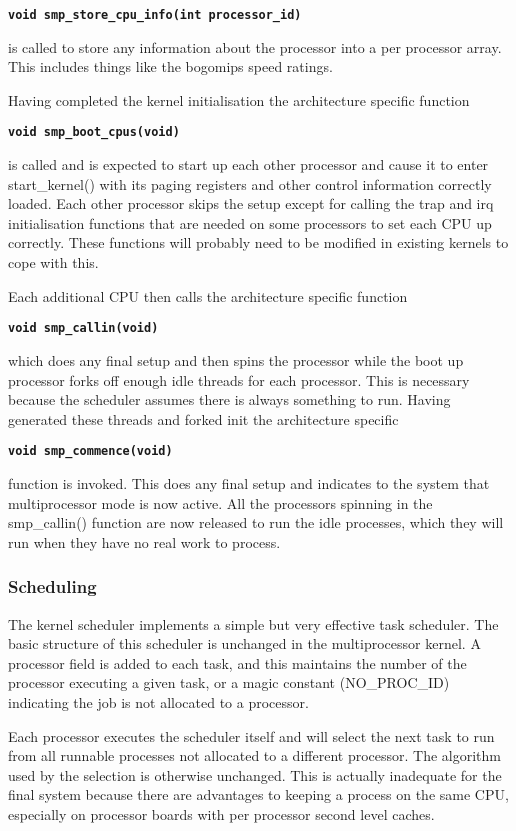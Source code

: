 \documentclass[]{article}
\begin{document}
{\tt \bf{void smp\_store\_cpu\_info(int processor\_id) }}

is called to store any information about the processor into a per processor 
array. This includes things like the bogomips speed ratings.

Having completed the kernel initialisation the architecture specific 
function

{\tt \bf void smp\_boot\_cpus(void) }

is called and is expected to start up each other processor and cause it to 
enter start\_kernel() with its paging registers and other control 
information correctly loaded. Each other processor skips the setup except 
for calling the trap and irq initialisation functions that are needed on 
some processors to set each CPU up correctly.  These functions will 
probably need to be modified in existing kernels to cope with this.


Each additional CPU then calls the architecture specific function

{\tt \bf void smp\_callin(void)}

which does any final setup and then spins the processor while the boot 
up processor forks off enough idle threads for each processor. This is 
necessary because the scheduler assumes there is always something to run. 
Having generated these threads and forked init the architecture specific 

{\tt \bf void smp\_commence(void)}

function is invoked. This does any final setup and indicates to the system 
that multiprocessor mode is now active. All the processors spinning in the 
smp\_callin() function are now released to run the idle processes, which 
they will run when they have no real work to process.


\subsubsection{Scheduling}
The kernel scheduler implements a simple but very effective task 
scheduler. The basic structure of this scheduler is unchanged in the 
multiprocessor kernel. A processor field is added to each task, and this 
maintains the number of the processor executing a given task, or a magic 
constant (NO\_PROC\_ID)  indicating the job is not allocated to a processor. 
	 
Each processor executes the scheduler itself and will select the next task 
to run from all runnable processes not allocated to a different processor. 
The algorithm used by the selection is otherwise unchanged. This is 
actually inadequate for the final system because there are advantages to 
keeping a process on the same CPU, especially on processor boards with per 
processor second level caches.
\end{document}
